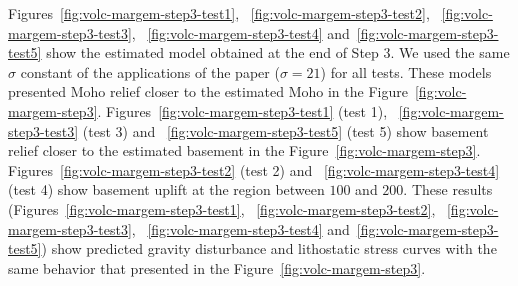 \documentclass[manuscript]{geophysics}
\begin{document}
Figures~\ref{fig:volc-margem-step3-test1}, ~\ref{fig:volc-margem-step3-test2}, ~\ref{fig:volc-margem-step3-test3}, ~\ref{fig:volc-margem-step3-test4} and~\ref{fig:volc-margem-step3-test5} show the estimated model obtained at the end of Step 3. We used the same $\sigma$ constant of the applications of the paper ($\sigma = 21$) for all tests. These models presented Moho relief closer to the estimated Moho in the Figure~\ref{fig:volc-margem-step3}. Figures~\ref{fig:volc-margem-step3-test1} (test 1), ~\ref{fig:volc-margem-step3-test3} (test 3) and ~\ref{fig:volc-margem-step3-test5} (test 5) show basement relief closer to the estimated basement in the Figure~\ref{fig:volc-margem-step3}. Figures~\ref{fig:volc-margem-step3-test2} (test 2) and ~\ref{fig:volc-margem-step3-test4} (test 4) show basement uplift at the region between $100$ and $200$. These results (Figures~\ref{fig:volc-margem-step3-test1}, ~\ref{fig:volc-margem-step3-test2}, ~\ref{fig:volc-margem-step3-test3}, ~\ref{fig:volc-margem-step3-test4} and~\ref{fig:volc-margem-step3-test5}) show predicted gravity disturbance and lithostatic stress curves with the same behavior that presented in the Figure~\ref{fig:volc-margem-step3}. 



\end{document}
